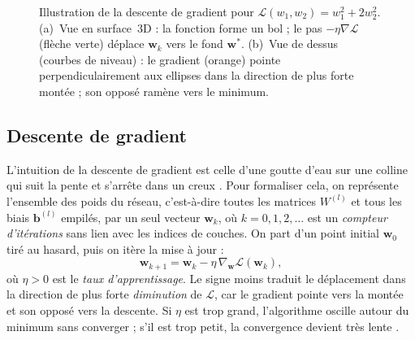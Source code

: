 \documentclass[a4paper,french]{style-LaTeX}
\begin{document}
\begin{figure}[h]
\begin{minipage}[c]{0.46\linewidth}
\end{minipage}
\caption{Illustration de la descente de gradient pour $\mathcal{L}(w_1,w_2)=w_1^2+2w_2^2$. (a)~Vue en surface~3D : la fonction forme un bol ; le pas $-\eta\nabla\mathcal{L}$ (flèche verte) déplace $\mathbf{w}_k$ vers le fond $\mathbf{w}^*$. (b)~Vue de dessus (courbes de niveau) : le gradient (orange) pointe perpendiculairement aux ellipses dans la direction de plus forte montée ; son opposé ramène vers le minimum.}
\label{fig:gradient}
\end{figure}

\subsection*{Descente de gradient}

L'intuition de la descente de gradient est celle d'une goutte d'eau sur une colline qui suit la pente et s'arrête dans un creux \cite{Exo7deepmath}. Pour formaliser cela, on représente l'ensemble des poids du réseau, c'est-à-dire toutes les matrices $W^{(l)}$ et tous les biais $\mathbf{b}^{(l)}$ empilés, par un seul vecteur $\mathbf{w}_k$, où $k = 0, 1, 2, \ldots$ est un \emph{compteur d'itérations} sans lien avec les indices de couches. On part d'un point initial $\mathbf{w}_0$ tiré au hasard, puis on itère la mise à jour :
\begin{equation}
  \mathbf{w}_{k+1} = \mathbf{w}_k - \eta\, \nabla_{\mathbf{w}} \mathcal{L}(\mathbf{w}_k),
  \label{eq:gdescent}
\end{equation}
où $\eta > 0$ est le \emph{taux d'apprentissage}. Le signe moins traduit le déplacement dans la direction de plus forte \emph{diminution} de $\mathcal{L}$, car le gradient pointe vers la montée et son opposé vers la descente. Si $\eta$ est trop grand, l'algorithme oscille autour du minimum sans converger ; s'il est trop petit, la convergence devient très lente \cite{Exo7deepmath}.
\end{document}

